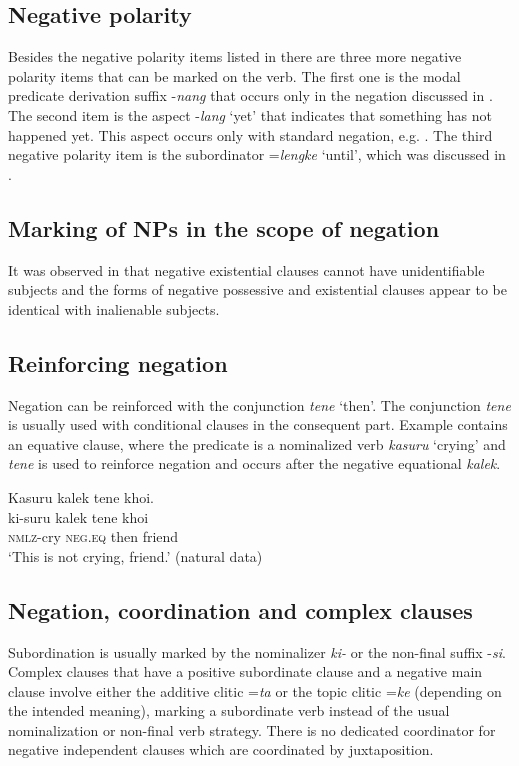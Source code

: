 \documentclass[output=paper,colorlinks,citecolor=brown]{langscibook}
\begin{document}
\subsection{Negative polarity}\label{sec:amr:4.2}
Besides the negative polarity items listed in  there are three more negative polarity items that can be marked on the verb. The first one is the modal predicate derivation suffix -\textit{nang} that occurs only in the negation discussed in . The second item is the aspect -\textit{lang} ‘yet’ that indicates that something has not happened yet. This aspect occurs only with standard negation, e.g. . The third negative polarity item is the subordinator =\textit{lengke} ‘until’, which was discussed in .



\subsection{Marking of NPs in the scope of negation}\label{sec:amr:4.3}
It was observed in  that negative existential clauses cannot have unidentifiable subjects and the forms of negative possessive and existential clauses appear to be identical with inalienable subjects. 

\subsection{Reinforcing negation}\label{sec:amr:4.4}
Negation can be reinforced with the conjunction \textit{tene} ‘then’. The conjunction \textit{tene} is usually used with conditional clauses in the consequent part. Example  contains an equative clause, where the predicate is a nominalized verb \textit{kasuru} ‘crying’ and \textit{tene} is used to reinforce negation and occurs after the negative equational \textit{kalek}. 

\ea\label{ex:amr:56} Kasuru kalek tene khoi.\\
    \gll ki-suru kalek tene khoi\\
          \textsc{nmlz}{}-cry \textsc{neg}.\textsc{eq} then friend\\
    \glt ‘This is not crying, friend.’  (natural data)
\z

\subsection{Negation, coordination and complex clauses} \label{sec:amr:4.5}
Subordination is usually marked by the nominalizer \textit{ki-} or the non-final suffix -\textit{si}. Complex clauses that have a positive subordinate clause and a negative main clause involve either the additive clitic =\textit{ta} or the topic clitic =\textit{ke} (depending on the intended meaning), marking a subordinate verb instead of the usual nominalization or non-final verb strategy. There is no dedicated coordinator for negative independent clauses which are coordinated by juxtaposition.
\end{document}
